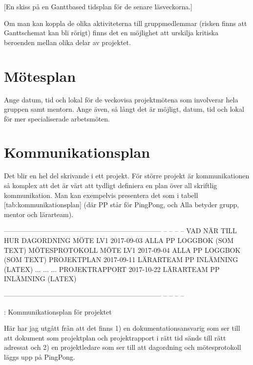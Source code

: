 \documentclass[a4paper]{article}
\begin{document}
[En skiss på en Ganttbased tidsplan för de senare läsveckorna.]

Om man kan koppla de olika aktiviteterna till gruppmedlemmar (risken
finns att Ganttschemat kan bli rörigt) finns det en möjlighet att
urskilja kritiska beroenden mellan olika delar av projektet.



\section{Mötesplan}


Ange datum, tid och lokal för de veckovisa projektmötena som involverar
hela gruppen samt mentorn. Ange även, så långt det är möjligt, datum,
tid och lokal för mer specialiserade arbetsmöten.



\section{Kommunikationsplan}


Det blir en hel del skrivande i ett projekt. För större projekt är
kommunikationen så komplex att det är värt att tydligt definiera en plan
över all skriftlig kommunikation. Man kan exempelvis presentera det som
i tabell [tab:kommunikationsplan] (där PP står för PingPong, och Alla
betyder grupp, mentor och lärarteam).

  --------------------------------------------------------------------- -- -- -- --
  VAD  NÄR  TILL  HUR                                                         
  DAGORDNING MÖTE LV1  2017-09-03  ALLA  PP LOGGBOK (SOM TEXT)                
  MÖTESPROTOKOLL MÖTE LV1  2017-09-04  ALLA  PP LOGGBOK (SOM TEXT)            
  PROJEKTPLAN  2017-09-11  LÄRARTEAM  PP INLÄMNING (LATEX)                    
  ...  ...  ...                                                               
  PROJEKTRAPPORT  2017-10-22  LÄRARTEAM  PP INLÄMNING (LATEX)                 
                                                                                 
  --------------------------------------------------------------------- -- -- -- --

  : Kommunikationsplan för projektet

Här har jag utgått från att det finns 1) en dokumentationsansvarig som
ser till att dokument som projektplan och projektrapport i rätt tid
sänds till rätt adressat och 2) en projektledare som ser till att
dagordning och mötesprotokoll läggs upp på PingPong.
\end{document}
